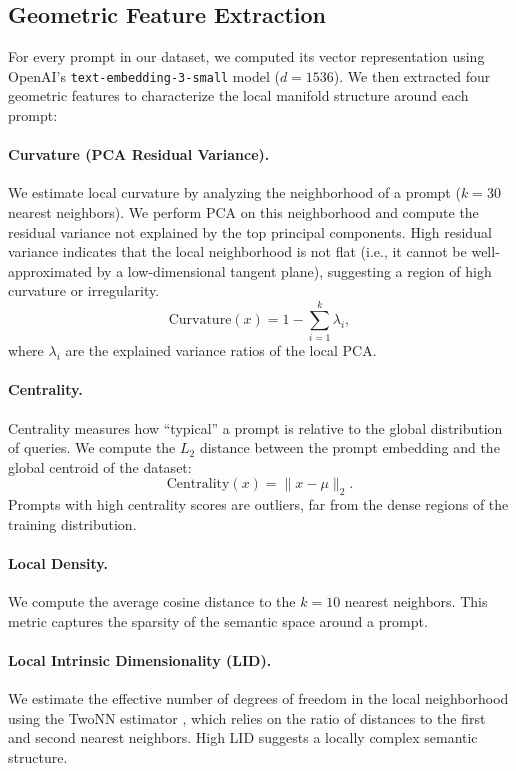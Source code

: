 \documentclass{article}
\begin{document}
\subsection{Geometric Feature Extraction}
For every prompt in our dataset, we computed its vector representation using OpenAI's \texttt{text-embedding-3-small} model ($d=1536$). We then extracted four geometric features to characterize the local manifold structure around each prompt:

\paragraph{Curvature (PCA Residual Variance).}
We estimate local curvature by analyzing the neighborhood of a prompt ($k=30$ nearest neighbors). We perform PCA on this neighborhood and compute the residual variance not explained by the top principal components. High residual variance indicates that the local neighborhood is not flat (i.e., it cannot be well-approximated by a low-dimensional tangent plane), suggesting a region of high curvature or irregularity.
\[ \text{Curvature}(x) = 1 - \sum_{i=1}^{k} \lambda_i, \]
where $\lambda_i$ are the explained variance ratios of the local PCA.

\paragraph{Centrality.}
Centrality measures how ``typical'' a prompt is relative to the global distribution of queries. We compute the $L_2$ distance between the prompt embedding and the global centroid of the dataset:
\[ \text{Centrality}(x) = \| x - \mu \|_2. \]
Prompts with high centrality scores are outliers, far from the dense regions of the training distribution.

\paragraph{Local Density.}
We compute the average cosine distance to the $k=10$ nearest neighbors. This metric captures the sparsity of the semantic space around a prompt.

\paragraph{Local Intrinsic Dimensionality (LID).}
We estimate the effective number of degrees of freedom in the local neighborhood using the TwoNN estimator \citep{facco2017twonn}, which relies on the ratio of distances to the first and second nearest neighbors. High LID suggests a locally complex semantic structure.
\end{document}
